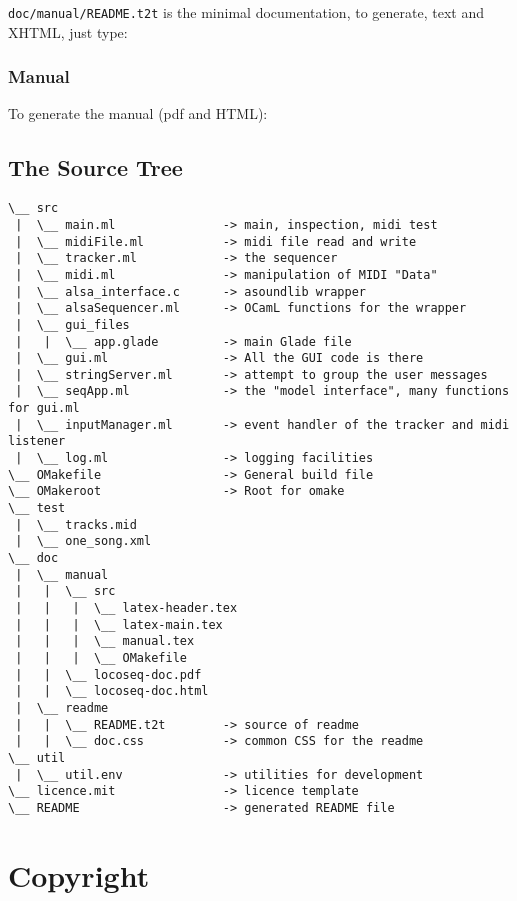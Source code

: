 \texttt{doc/manual/README.t2t} is the minimal documentation, to
generate, text and XHTML, just type:


\subsubsection{Manual}

To generate the manual (pdf and HTML):



\subsection{The Source Tree}

\begin{verbatim}
\__ src                                        
 |  \__ main.ml               -> main, inspection, midi test
 |  \__ midiFile.ml           -> midi file read and write
 |  \__ tracker.ml            -> the sequencer
 |  \__ midi.ml               -> manipulation of MIDI "Data"
 |  \__ alsa_interface.c      -> asoundlib wrapper
 |  \__ alsaSequencer.ml      -> OCamL functions for the wrapper
 |  \__ gui_files                   
 |   |  \__ app.glade         -> main Glade file
 |  \__ gui.ml                -> All the GUI code is there
 |  \__ stringServer.ml       -> attempt to group the user messages
 |  \__ seqApp.ml             -> the "model interface", many functions for gui.ml 
 |  \__ inputManager.ml       -> event handler of the tracker and midi listener
 |  \__ log.ml                -> logging facilities
\__ OMakefile                 -> General build file
\__ OMakeroot                 -> Root for omake
\__ test                                       
 |  \__ tracks.mid  
 |  \__ one_song.xml                             
\__ doc
 |  \__ manual
 |   |  \__ src
 |   |   |  \__ latex-header.tex
 |   |   |  \__ latex-main.tex
 |   |   |  \__ manual.tex
 |   |   |  \__ OMakefile
 |   |  \__ locoseq-doc.pdf
 |   |  \__ locoseq-doc.html
 |  \__ readme
 |   |  \__ README.t2t        -> source of readme
 |   |  \__ doc.css           -> common CSS for the readme 
\__ util                      
 |  \__ util.env              -> utilities for development
\__ licence.mit               -> licence template
\__ README                    -> generated README file
\end{verbatim}


\section{Copyright}
\label{sec:copyright}

